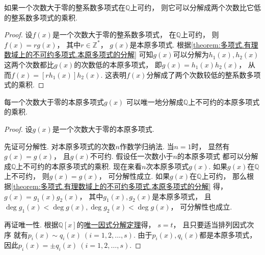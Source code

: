 \begin{corollary}\label{theorem:多项式.有理数域上的不可约多项式.本原多项式的分解.推论}
如果一个次数大于零的整系数多项式在\(\mathbb{Q}\)上可约，
则它可以分解成两个次数比它低的整系数多项式的乘积.
\begin{proof}
设\(f(x)\)是一个次数大于零的整系数多项式，
在\(\mathbb{Q}\)上可约，
则\(f(x)= r g(x)\)，
其中\(r\in\mathbb{Z}^*\)，
\(g(x)\)是本原多项式.
根据\cref{theorem:多项式.有理数域上的不可约多项式.本原多项式的分解}
可知\(g(x)\)可以分解为\(h_1(x),h_2(x)\)
这两个次数都比\(g(x)\)的次数低的本原多项式，
即\(g(x)=h_1(x) h_2(x)\)，
从而\(f(x)=[r h_1(x)] h_2(x)\).
这表明\(f(x)\)分解成了两个次数较低的整系数多项式的乘积.
\end{proof}
\end{corollary}

\begin{theorem}\label{theorem:多项式.有理数域上的不可约多项式.高次本原多项式可唯一分解为不可约本原多项式的乘积}
每一个次数大于零的本原多项式\(g(x)\)
可以唯一地分解成\(\mathbb{Q}\)上不可约的本原多项式的乘积.
\begin{proof}
设\(g(x)\)是一个次数大于零的本原多项式.

先证可分解性.
对本原多项式的次数\(n\)作数学归纳法.
当\(n=1\)时，
显然有\(g(x)=g(x)\)，
且\(g(x)\)不可约.
假设任一次数小于\(n\)的本原多项式
都可以分解成\(\mathbb{Q}\)上不可约的本原多项式的乘积.
现在来看\(n\)次本原多项式\(g(x)\).
如果\(g(x)\)在\(\mathbb{Q}\)上不可约，
则\(g(x)=g(x)\)，
可分解性成立.
如果\(g(x)\)在\(\mathbb{Q}\)上可约，
那么根据\cref{theorem:多项式.有理数域上的不可约多项式.本原多项式的分解} 得，
\(g(x)=g_1(x) g_2(x)\)，
其中\(g_1(x),g_2(x)\)是本原多项式，
且\(\deg g_1(x) < \deg g(x),
\deg g_2(x) < \deg g(x)\)，
可分解性也成立.

再证唯一性.
根据\(\mathbb{Q}[x]\)的\hyperref[theorem:多项式.唯一因式分解定理]{唯一因式分解定理}得，
\(s=t\)，
且只要适当排列因式次序
就有\(p_i(x) \sim q_i(x)\ (i=1,2,\dotsc,s)\).
由于\(p_i(x),q_i(x)\)都是本原多项式，
因此\(p_i(x)=\pm q_i(x)\ (i=1,2,\dotsc,s)\).
\end{proof}
\end{theorem}

